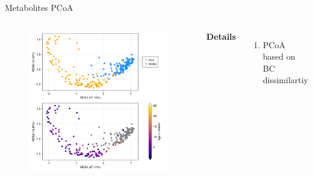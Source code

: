 
\begin{frame}{Metabolites PCoA}
    \begin{columns}[c] %

    
        \begin{figure}
        \includegraphics[width=1\linewidth]{../figures/metabolites_pcoa.png}
        \end{figure}

    
        \textbf{Details}
        \begin{enumerate}
            \item PCoA based on BC dissimilartiy
        \end{enumerate}

    \end{columns}

\end{frame}


